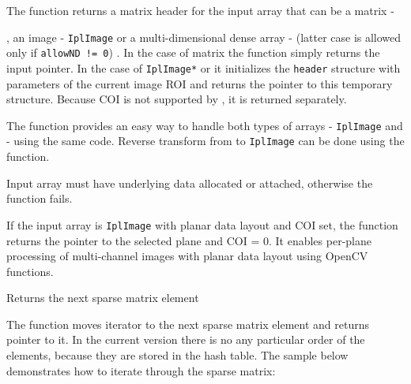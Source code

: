 
\begin{description}
\ifC
{}
\fi
\end{description}

The function returns a matrix header for the input array that can be a matrix - 

, an image - \texttt{IplImage} or a multi-dimensional dense array -  (latter case is allowed only if \texttt{allowND != 0}) . In the case of matrix the function simply returns the input pointer. In the case of \texttt{IplImage*} or  it initializes the \texttt{header} structure with parameters of the current image ROI and returns the pointer to this temporary structure. Because COI is not supported by , it is returned separately.

The function provides an easy way to handle both types of arrays - \texttt{IplImage} and  - using the same code. Reverse transform from  to \texttt{IplImage} can be done using the  function.

Input array must have underlying data allocated or attached, otherwise the function fails.

If the input array is \texttt{IplImage} with planar data layout and COI set, the function returns the pointer to the selected plane and COI = 0. It enables per-plane processing of multi-channel images with planar data layout using OpenCV functions.

\ifC
{} 
Returns the next sparse matrix element


\begin{description}
\end{description}


The function moves iterator to the next sparse matrix element and returns pointer to it. In the current version there is no any particular order of the elements, because they are stored in the hash table. The sample below demonstrates how to iterate through the sparse matrix:

